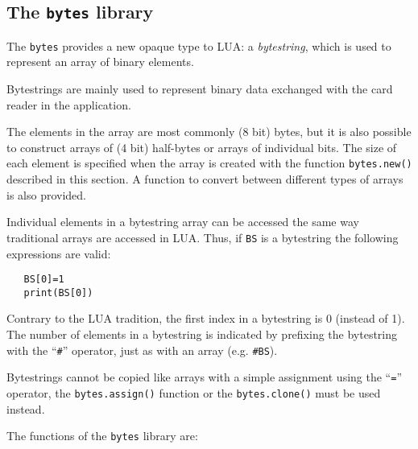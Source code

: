 \documentclass[11pt]{article}
\begin{document}
\subsection{The \texttt{bytes} library}

The \texttt{bytes} provides a new opaque type to LUA: a \textit{bytestring}, 
which is used to represent an array of binary elements. 

Bytestrings are mainly used to represent binary data exchanged with
the card reader in the application.

The elements in the array are most commonly (8 bit) bytes, but
it is also possible to construct arrays of (4 bit) half-bytes or
arrays of individual bits. The size of each element is specified 
when the array is created with the function \texttt{bytes.new()}
described in this section. A function to convert between different 
types of arrays is also provided.

Individual elements in a bytestring array can be accessed the same 
way traditional arrays are accessed in LUA. Thus, if \texttt{BS} is
a bytestring the following expressions are valid:
\begin{verbatim}
   BS[0]=1
   print(BS[0])
\end{verbatim} 
Contrary to the LUA tradition, the first index in a bytestring is 0
(instead of 1). The number of elements in a bytestring is indicated 
by prefixing the bytestring with the ``\texttt{\#}'' operator, just as 
with an array (e.g. \texttt{\#BS}).

Bytestrings cannot be copied like arrays with a simple assignment 
using the ``\texttt{=}'' operator, the \texttt{bytes.assign()} function
or the \texttt{bytes.clone()} must be used instead.  

The functions of the \texttt{bytes} library are:
\end{document}
